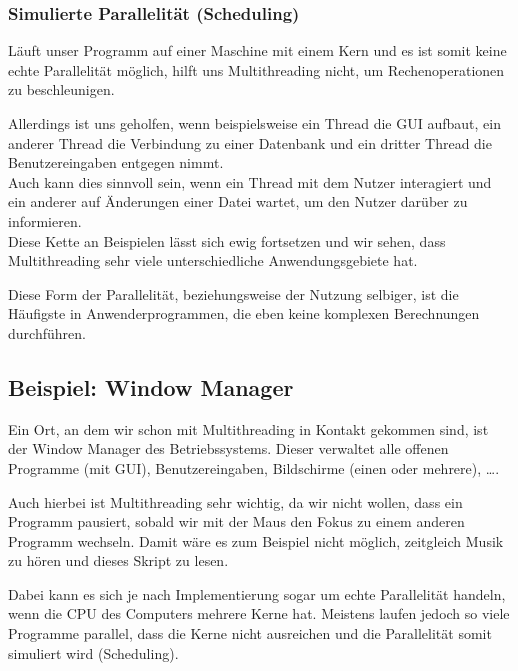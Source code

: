 	\subsubsection{Simulierte Parallelität (Scheduling)}
		Läuft unser Programm auf einer Maschine mit einem Kern und es ist somit keine echte Parallelität möglich, hilft uns Multithreading nicht, um Rechenoperationen zu beschleunigen.
		
		Allerdings ist uns geholfen, wenn beispielsweise ein Thread die GUI aufbaut, ein anderer Thread die Verbindung zu einer Datenbank und ein dritter Thread die Benutzereingaben entgegen nimmt. \\ Auch kann dies sinnvoll sein, wenn ein Thread mit dem Nutzer interagiert und ein anderer auf Änderungen einer Datei wartet, um den Nutzer darüber zu informieren. \\ Diese Kette an Beispielen lässt sich ewig fortsetzen und wir sehen, dass Multithreading sehr viele unterschiedliche Anwendungsgebiete hat.
		
		Diese Form der Parallelität, beziehungsweise der Nutzung selbiger, ist die Häufigste in Anwenderprogrammen, die eben keine komplexen Berechnungen durchführen.

\subsection{Beispiel: Window Manager}
	Ein Ort, an dem wir schon mit Multithreading in Kontakt gekommen sind, ist der Window Manager des Betriebssystems. Dieser verwaltet alle offenen Programme (mit GUI), Benutzereingaben, Bildschirme (einen oder mehrere), \dots.
	
	Auch hierbei ist Multithreading sehr wichtig, da wir nicht wollen, dass ein Programm pausiert, sobald wir mit der Maus den Fokus zu einem anderen Programm wechseln. Damit wäre es zum Beispiel nicht möglich, zeitgleich Musik zu hören und dieses Skript zu lesen.
	
	Dabei kann es sich je nach Implementierung sogar um echte Parallelität handeln, wenn die CPU des Computers mehrere Kerne hat. Meistens laufen jedoch so viele Programme parallel, dass die Kerne nicht ausreichen und die Parallelität somit simuliert wird (Scheduling).
